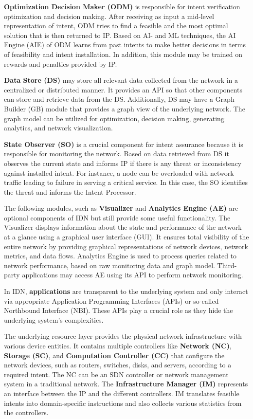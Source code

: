 \textbf{Optimization Decision Maker (ODM)} is responsible for intent verification optimization and decision making. After receiving as input a mid-level representation of intent, ODM tries to find a feasible and the most optimal solution that is then returned to IP. Based on AI- and ML techniques, the AI Engine (AIE) of ODM learns from past intents to make better decisions in terms of feasibility and intent installation. In addition, this module may be trained on rewards and penalties provided by IP.

\textbf{{}Data Store (DS)} may store all relevant data collected from the network in a centralized or distributed manner. It provides an API so that other components can store and retrieve data from the DS. Additionally, DS may have a Graph Builder (GB) module that provides a graph view of the underlying network. The graph model can be utilized for optimization, decision making, generating analytics, and network visualization.

\textbf{State Observer (SO)} is a crucial component for intent assurance because it is responsible for monitoring the network. Based on data retrieved from DS it observes the current state and informs IP if there is any threat or inconsistency against installed intent. For instance, a node can be overloaded with network traffic leading to failure in serving a critical service. In this case, the SO identifies the threat and informs the Intent Processor.

The following modules, such as \textbf{Visualizer} and \textbf{Analytics Engine (AE)} are optional components of IDN but still provide some useful functionality. The Visualizer displays information about the state and performance of the network at a glance using a graphical user interface (GUI). It ensures total visibility of the entire network by providing graphical representations of network devices, network metrics, and data flows. Analytics Engine is used to process queries related to network performance, based on raw monitoring data and graph model. Third-party applications may access AE using its API to perform network monitoring.

In IDN, \textbf{applications} are transparent to the underlying system and only interact via appropriate Application Programming Interfaces (APIs) or so-called Northbound Interface (NBI). These APIs play a crucial role as they hide the underlying system's complexities.

The underlying resource layer provides the physical network infrastructure with various device entities. It contains multiple controllers like \textbf{Network (NC)}, \textbf{Storage (SC)}, and \textbf{Computation Controller (CC)} that configure the network devices, such as routers, switches, disks, and servers, according to a required intent. The NC can be an SDN controller or network management system in a traditional network. The \textbf{Infrastructure Manager (IM)} represents an interface between the IP and the different controllers. IM translates feasible intents into domain-specific instructions and also collects various statistics from the controllers.






